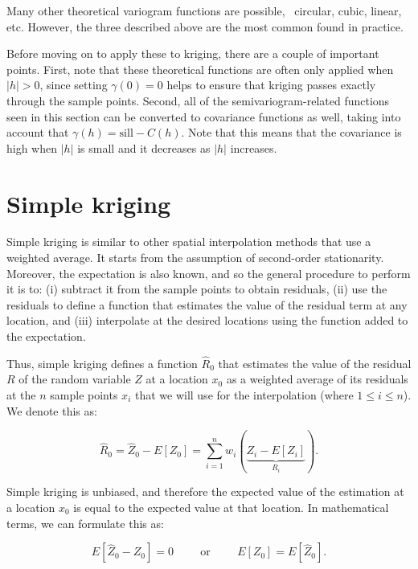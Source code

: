 Many other theoretical variogram functions are possible, \eg\ circular, cubic, linear, etc.
However, the three described above are the most common found in practice.

Before moving on to apply these to kriging, there are a couple of important points.
First, note that these theoretical functions are often only applied when \(|h| > 0\), since setting \(\gamma(0) = 0\) helps to ensure that kriging passes exactly through the sample points.
Second, all of the semivariogram-related functions seen in this section can be converted to covariance functions as well, taking into account that \(\gamma(h) = \mathrm{sill} - C(h)\).
Note that this means that the covariance is high when \(|h|\) is small and it decreases as \(|h|\) increases.

\section{Simple kriging}

Simple kriging is similar to other spatial interpolation methods that use a weighted average.
It starts from the assumption of second-order stationarity.
Moreover, the expectation is also known, and so the general procedure to perform it is to: (i) subtract it from the sample points to obtain residuals, (ii) use the residuals to define a function that estimates the value of the residual term at any location, and (iii) interpolate at the desired locations using the function added to the expectation.

Thus, simple kriging defines a function \(\hat{R}_0\) that estimates the value of the residual \(R\) of the random variable \(Z\) at a location \(x_0\) as a weighted average of its residuals at the \(n\) sample points \(x_i\) that we will use for the interpolation (where \(1 \leq i \leq n\)).
We denote this as:

\begin{equation}
\label{eq:wask}
\hat{R}_0 = \hat{Z}_0 - E[Z_0] = \sum_{i=1}^n w_i (\underbrace{Z_i-E[Z_i]}_{R_i}).
\end{equation}

Simple kriging is unbiased, and therefore the expected value of the estimation at a location \(x_0\) is equal to the expected value at that location.
In mathematical terms, we can formulate this as:

\begin{equation}
\label{eq:unbiased}
E\left[ \hat{Z}_0 - Z_0 \right] = 0 \hspace{1cm}\text{or}\hspace{1cm}E\left[Z_0\right] = E\left[ \hat{Z}_0 \right].
\end{equation}

